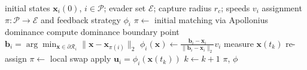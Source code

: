 \begin{algorithm}[t]
\caption{Distributed Capture Assignment for Multiplayer Reach-Avoid Games}
\label{alg:assignment}
\begin{algorithmic}[1]
\Require initial states $\mathbf{x}_i(0)$, $i \in \mathcal{P}$; evader set $\mathcal{E}$;
         capture radius $r_c$; speeds $v_i$
\Ensure assignment $\pi: \mathcal{P} \to \mathcal{E}$ and feedback strategy $\phi_i$
\State $\pi \leftarrow$ initial matching via Apollonius dominance
    \State compute dominance boundary point
           $\mathbf{b}_i = \arg\min_{\mathbf{x}\in\partial\mathcal{R}_i} \|\mathbf{x}-\mathbf{x}_{\pi(i)}\|_2$
    \State $\phi_i(\mathbf{x}) \leftarrow \frac{\mathbf{b}_i - \mathbf{x}_i}{\|\mathbf{b}_i - \mathbf{x}_i\|_2} v_i$
\EndFor
{}
    \State measure $\mathbf{x}(t_k)$
        \State re-assign $\pi \leftarrow$ local swap
    \EndIf
    \State apply $\mathbf{u}_i = \phi_i(\mathbf{x}(t_k))$
    \State $k \leftarrow k+1$
\EndWhile
\State \Return $\pi$, $\phi$
\end{algorithmic}
\end{algorithm}
%
